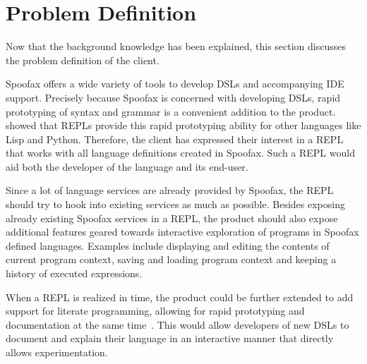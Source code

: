 \section{Problem Definition}
\label{sec:problem-definition}

Now that the background knowledge has been explained, this section discusses the
problem definition of the client.

Spoofax offers a wide variety of tools to develop DSLs and
accompanying IDE support. Precisely because Spoofax is concerned with
developing DSLs, rapid prototyping of syntax and grammar is a
convenient addition to the product.  showed that REPLs
provide this rapid prototyping ability for other languages like Lisp
and Python. Therefore, the client has expressed their interest in
a REPL that works with all language definitions created in
Spoofax. Such a REPL would aid both the developer of the language and
its end-user.

Since a lot of language services are already provided by Spoofax, the
REPL should try to hook into existing services as much as possible.
Besides exposing already existing Spoofax services in a REPL,
the product should also expose additional features geared
towards interactive exploration of programs in Spoofax defined
languages.  Examples include displaying and editing the contents of
current program context, saving and loading program context and
keeping a history of executed expressions.

When a REPL is realized in time, the product could be further extended to add
support for literate programming, allowing for rapid prototyping and
documentation at the same time~\cite{schulte2012}. This would allow
developers of new DSLs to document and explain their language in an
interactive manner that directly allows experimentation.

